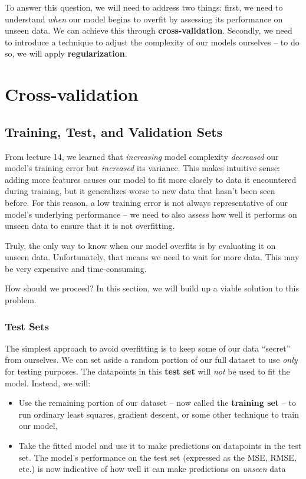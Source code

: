 \documentclass[
  letterpaper,
  DIV=11,
  numbers=noendperiod]{scrreprt}
\providecommand{\tightlist}{%
  \setlength{\itemsep}{0pt}\setlength{\parskip}{0pt}}\usepackage{longtable,booktabs,array}
\begin{document}
To answer this question, we will need to address two things: first, we
need to understand \emph{when} our model begins to overfit by assessing
its performance on unseen data. We can achieve this through
\textbf{cross-validation}. Secondly, we need to introduce a technique to
adjust the complexity of our models ourselves -- to do so, we will apply
\textbf{regularization}.

\section{Cross-validation}\label{cross-validation}

\subsection{Training, Test, and Validation
Sets}\label{training-test-and-validation-sets}

From lecture 14, we learned that \emph{increasing} model complexity
\emph{decreased} our model's training error but \emph{increased} its
variance. This makes intuitive sense: adding more features causes our
model to fit more closely to data it encountered during training, but it
generalizes worse to new data that hasn't been seen before. For this
reason, a low training error is not always representative of our model's
underlying performance -- we need to also assess how well it performs on
unseen data to ensure that it is not overfitting.

Truly, the only way to know when our model overfits is by evaluating it
on unseen data. Unfortunately, that means we need to wait for more data.
This may be very expensive and time-consuming.

How should we proceed? In this section, we will build up a viable
solution to this problem.

\subsubsection{Test Sets}\label{test-sets}

The simplest approach to avoid overfitting is to keep some of our data
``secret'' from ourselves. We can set aside a random portion of our full
dataset to use \emph{only} for testing purposes. The datapoints in this
\textbf{test set} will \emph{not} be used to fit the model. Instead, we
will:

\begin{itemize}
\tightlist
\item
  Use the remaining portion of our dataset -- now called the
  \textbf{training set} -- to run ordinary least squares, gradient
  descent, or some other technique to train our model,
\item
  Take the fitted model and use it to make predictions on datapoints in
  the test set. The model's performance on the test set (expressed as
  the MSE, RMSE, etc.) is now indicative of how well it can make
  predictions on \emph{unseen} data
\end{itemize}
\end{document}
